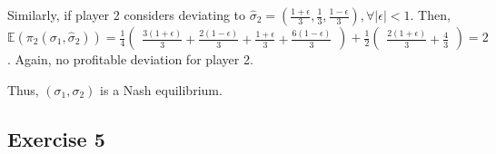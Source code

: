 \documentclass[]{article}
\begin{document}
Similarly, if player 2 considers deviating to $\hat{\sigma}_2 = (\frac{1+\epsilon}{3}, \frac{1}{3}, \frac{1-\epsilon}{3}), \forall\mid\epsilon\mid<1$. Then, $\mathbb{E}(\pi_2(\sigma_1, \hat{\sigma}_2)) = \frac{1}{4}\begin{pmatrix}\frac{3(1 + \epsilon)}{3} + \frac{2(1 - \epsilon)}{3} + \frac{1 + \epsilon}{3} + \frac{6(1 - \epsilon)}{3}\end{pmatrix} + \frac{1}{2}\begin{pmatrix}\frac{2(1 + \epsilon)}{3} + \frac{4}{3}\end{pmatrix} = 2$. Again, no profitable deviation for player 2.

Thus, $(\sigma_1, \sigma_2)$ is a Nash equilibrium.

\subsection*{Exercise 5}
\end{document}

